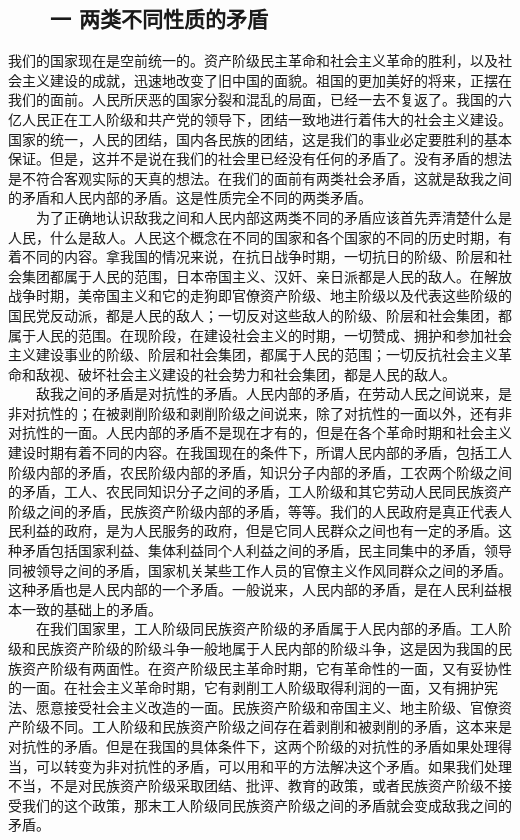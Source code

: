 \documentclass[cn,11pt,chinese]{elegantbook}
\def\myformat#1{\hfil\hfil #1}
\begin{document}
\subsection*{\myformat{　　一 两类不同性质的矛盾}}
我们的国家现在是空前统一的。资产阶级民主革命和社会主义革命的胜利，以及社会主义建设的成就，迅速地改变了旧中国的面貌。祖国的更加美好的将来，正摆在我们的面前。人民所厌恶的国家分裂和混乱的局面，已经一去不复返了。我国的六亿人民正在工人阶级和共产党的领导下，团结一致地进行着伟大的社会主义建设。国家的统一，人民的团结，国内各民族的团结，这是我们的事业必定要胜利的基本保证。但是，这并不是说在我们的社会里已经没有任何的矛盾了。没有矛盾的想法是不符合客观实际的天真的想法。在我们的面前有两类社会矛盾，这就是敌我之间的矛盾和人民内部的矛盾。这是性质完全不同的两类矛盾。\\
　　为了正确地认识敌我之间和人民内部这两类不同的矛盾应该首先弄清楚什么是人民，什么是敌人。人民这个概念在不同的国家和各个国家的不同的历史时期，有着不同的内容。拿我国的情况来说，在抗日战争时期，一切抗日的阶级、阶层和社会集团都属于人民的范围，日本帝国主义、汉奸、亲日派都是人民的敌人。在解放战争时期，美帝国主义和它的走狗即官僚资产阶级、地主阶级以及代表这些阶级的国民党反动派，都是人民的敌人；一切反对这些敌人的阶级、阶层和社会集团，都属于人民的范围。在现阶段，在建设社会主义的时期，一切赞成、拥护和参加社会主义建设事业的阶级、阶层和社会集团，都属于人民的范围；一切反抗社会主义革命和敌视、破坏社会主义建设的社会势力和社会集团，都是人民的敌人。\\
　　敌我之间的矛盾是对抗性的矛盾。人民内部的矛盾，在劳动人民之间说来，是非对抗性的；在被剥削阶级和剥削阶级之间说来，除了对抗性的一面以外，还有非对抗性的一面。人民内部的矛盾不是现在才有的，但是在各个革命时期和社会主义建设时期有着不同的内容。在我国现在的条件下，所谓人民内部的矛盾，包括工人阶级内部的矛盾，农民阶级内部的矛盾，知识分子内部的矛盾，工农两个阶级之间的矛盾，工人、农民同知识分子之间的矛盾，工人阶级和其它劳动人民同民族资产阶级之间的矛盾，民族资产阶级内部的矛盾，等等。我们的人民政府是真正代表人民利益的政府，是为人民服务的政府，但是它同人民群众之间也有一定的矛盾。这种矛盾包括国家利益、集体利益同个人利益之间的矛盾，民主同集中的矛盾，领导同被领导之间的矛盾，国家机关某些工作人员的官僚主义作风同群众之间的矛盾。这种矛盾也是人民内部的一个矛盾。一般说来，人民内部的矛盾，是在人民利益根本一致的基础上的矛盾。\\
　　在我们国家里，工人阶级同民族资产阶级的矛盾属于人民内部的矛盾。工人阶级和民族资产阶级的阶级斗争一般地属于人民内部的阶级斗争，这是因为我国的民族资产阶级有两面性。在资产阶级民主革命时期，它有革命性的一面，又有妥协性的一面。在社会主义革命时期，它有剥削工人阶级取得利润的一面，又有拥护宪法、愿意接受社会主义改造的一面。民族资产阶级和帝国主义、地主阶级、官僚资产阶级不同。工人阶级和民族资产阶级之间存在着剥削和被剥削的矛盾，这本来是对抗性的矛盾。但是在我国的具体条件下，这两个阶级的对抗性的矛盾如果处理得当，可以转变为非对抗性的矛盾，可以用和平的方法解决这个矛盾。如果我们处理不当，不是对民族资产阶级采取团结、批评、教育的政策，或者民族资产阶级不接受我们的这个政策，那末工人阶级同民族资产阶级之间的矛盾就会变成敌我之间的矛盾。\\
\end{document}
